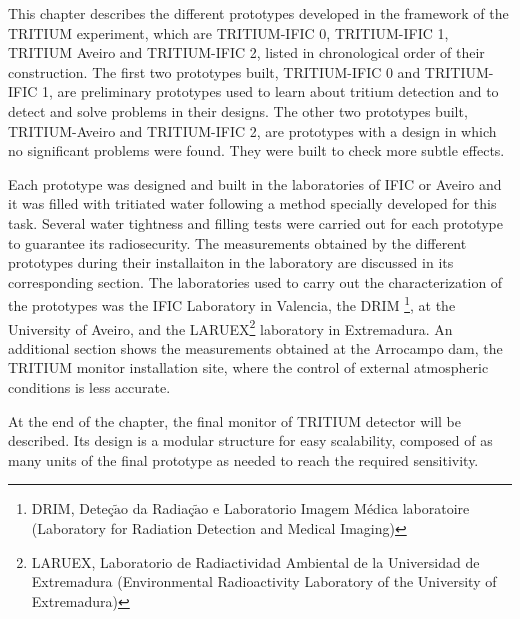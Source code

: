This chapter describes the different prototypes developed in the framework of the TRITIUM experiment, which are TRITIUM-IFIC 0, TRITIUM-IFIC 1, TRITIUM Aveiro and TRITIUM-IFIC 2, listed in chronological order of their construction. The first two prototypes built, TRITIUM-IFIC 0 and TRITIUM-IFIC 1, are preliminary prototypes used to learn about tritium detection and to detect and solve problems in their designs. The other two prototypes built, TRITIUM-Aveiro and TRITIUM-IFIC 2, are prototypes with a design in which no significant problems were found. They were built to check more subtle effects. 

Each prototype was designed and built in the laboratories of IFIC or Aveiro and it was filled with tritiated water following a method specially developed for this task. Several water tightness and filling tests were carried out for each prototype to guarantee its radiosecurity. The measurements obtained by the different prototypes during their installaiton in the laboratory are discussed in its corresponding section. The laboratories used to carry out the characterization of the prototypes was the IFIC Laboratory in Valencia, the DRIM \footnote{DRIM, Deteç$\tilde{\text{a}}$o da Radiaç$\tilde{\text{a}}$o e Laboratorio Imagem Médica laboratoire (Laboratory for Radiation Detection and Medical Imaging)}, at the University of Aveiro, and the LARUEX\footnote{LARUEX, Laboratorio de Radiactividad Ambiental de la Universidad de Extremadura (Environmental Radioactivity Laboratory of the University of Extremadura)} laboratory in Extremadura. An additional section shows the measurements obtained at the Arrocampo dam, the TRITIUM monitor installation site, where the control of external atmospheric conditions is less accurate.

At the end of the chapter, the final monitor of TRITIUM detector will be described. Its design is a modular structure for easy scalability, composed of as many units of the final prototype as needed to reach the required sensitivity.